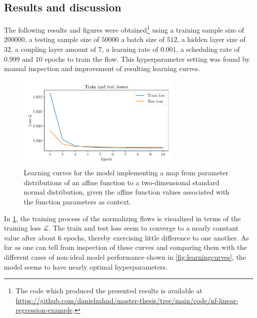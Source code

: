 \documentclass[a4paper,12pt]{report}
\begin{document}
\subsection{Results and discussion}
The following results and figures were obtained\footnote{The code which produced the presented results is available at \url{https://github.com/danielzahnd/master-thesis/tree/main/code/nf-linear-regression-example}.} using a training sample size of $200000$, a testing sample size of $50000$ a batch size of $512$, a hidden layer size of $32$, a coupling layer amount of $7$, a learning rate of $0.001$, a scheduling rate of $0.999$ and $10$ epochs to train the flow. This hyperparameter setting was found by manual inspection and improvement of resulting learning curves.
\begin{figure}[h!]
\centering
\includegraphics[width=8cm]{figures/nf-linear-regression-example-loss.pdf}
\caption{Learning curves for the model implementing a map from parameter distributions of an affine function to a two-dimensional standard normal distribution, given the affine function values associated with the function parameters as context.}
\label{fig:nf-linear-regression-example-loss}
\end{figure}
In \cref{fig:nf-linear-regression-example-loss}, the training process of the normalizing flows is visualized in terms of the training loss $\mathcal{L}$. The train and test loss seem to converge to a nearly constant value after about 6 epochs, thereby exercising little difference to one another. As far as one can tell from inspection of these curves and comparing them with the different cases of non-ideal model performance shown in \cref{fig:learningcurves}, the model seems to have nearly optimal hyperparameters.
\end{document}
